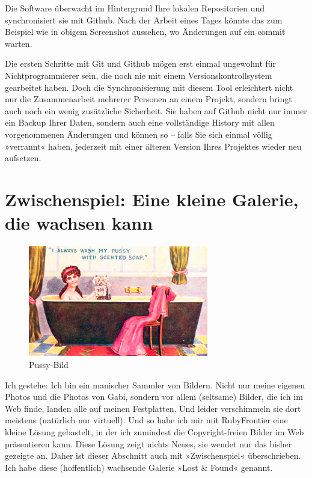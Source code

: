 \documentclass[11pt]{report}
\begin{document}
Die Software überwacht im Hintergrund Ihre lokalen Repositorien und
synchronisiert sie mit Github. Nach der Arbeit eines Tages könnte das
zum Beispiel wie in obigem Screenshot aussehen, wo Änderungen auf ein
commit warten.


Die ersten Schritte mit Git und Github mögen erst einmal ungewohnt für
Nichtprogrammierer sein, die noch nie mit einem Versionskontrollsystem
gearbeitet haben. Doch die Synchronisierung mit diesem Tool
erleichtert nicht nur die Zusammenarbeit mehrerer Personen an einem
Projekt, sondern bringt auch noch ein wenig zusätzliche
Sicherheit. Sie haben auf Github nicht nur immer ein Backup Ihrer
Daten, sondern auch eine vollständige History mit allen vorgenommenen
Änderungen und können so – falls Sie sich einmal völlig »verrannt«
haben, jederzeit mit einer älteren Version Ihres Projektes wieder neu
aufsetzen.
\chapter{Zwischenspiel: Eine kleine Galerie, die wachsen kann}
\label{sec-2-12}


\begin{figure}[h!]
\centering
\includegraphics[width=0.7\textwidth]{./images/pussi-waschen-1920er.png}
\caption{\label{pussi-waschen-1920er}Pussy-Bild}
\end{figure}

Ich gestehe: Ich bin ein manischer Sammler von Bildern. Nicht nur
meine eigenen Photos und die Photos von Gabi, sondern vor allem
(seltsame) Bilder, die ich im Web finde, landen alle auf meinen
Festplatten. Und leider verschimmeln sie dort meistens (natürlich nur
virtuell). Und so habe ich mir mit RubyFrontier eine kleine Lösung
gebastelt, in der ich zumindest die Copyright-freien Bilder im Web
präsentieren kann. Diese Lösung zeigt nichts Neues, sie wendet nur das
bisher gezeigte an. Daher ist dieser Abschnitt auch mit
»Zwischenspiel« überschrieben. Ich habe diese (hoffentlich) wachsende
Galerie »Lost \& Found« genannt.
\end{document}
